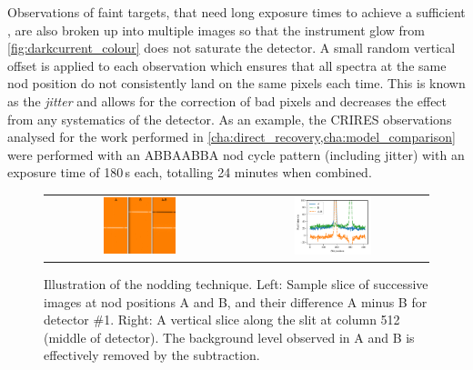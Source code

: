 Observations of faint targets, that need long exposure times to achieve a sufficient \snr{}, are also broken up into multiple images so that the instrument glow from \cref{fig:darkcurrent_colour} does not saturate the detector.
A small random vertical offset is applied to each observation which ensures that all spectra at the same nod position do not consistently land on the same pixels each time.
This is known as the \emph{jitter} and allows for the correction of bad pixels and decreases the effect from any systematics of the detector.
As an example, the {CRIRES} observations analysed for the work performed in \cref{cha:direct_recovery,cha:model_comparison} were performed with an {ABBAABBA} nod cycle pattern (including jitter) with an exposure time of 180\,\si{\second} each, totalling 24 minutes when combined.

\begin{figure}
    \centering
    \begin{tabular}{cc}    %
       \includegraphics[width=0.4\textwidth]{figures/reduction/Nods_AB_A-B_labelled.png} & \includegraphics[width=0.42\textwidth]{figures/reduction/nod_slice_example.pdf} \\
    \end{tabular}
    \caption[Illustration of the nodding technique.]{Illustration of the nodding technique.
        Left: Sample slice of successive images at nod positions A and B, and their difference A minus B for detector \#1.
        Right: A vertical slice along the slit at column 512 (middle of detector).
        The background level observed in A and B is effectively removed by the subtraction.}
    \label{fig:nodimages}
\end{figure}

